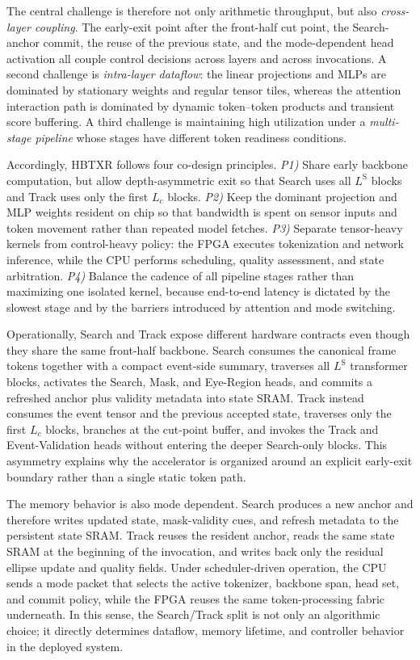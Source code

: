 \documentclass[journal]{IEEEtran}
\begin{document}
The central challenge is therefore not only arithmetic throughput, but also \emph{cross-layer coupling}. The early-exit point after the front-half cut point, the Search-anchor commit, the reuse of the previous state, and the mode-dependent head activation all couple control decisions across layers and across invocations. A second challenge is \emph{intra-layer dataflow}: the linear projections and MLPs are dominated by stationary weights and regular tensor tiles, whereas the attention interaction path is dominated by dynamic token--token products and transient score buffering. A third challenge is maintaining high utilization under a \emph{multi-stage pipeline} whose stages have different token readiness conditions.

Accordingly, HBTXR follows four co-design principles. \emph{P1)} Share early backbone computation, but allow depth-asymmetric exit so that Search uses all $L^{\mathrm S}$ blocks and Track uses only the first $L_c$ blocks. \emph{P2)} Keep the dominant projection and MLP weights resident on chip so that bandwidth is spent on sensor inputs and token movement rather than repeated model fetches. \emph{P3)} Separate tensor-heavy kernels from control-heavy policy: the FPGA executes tokenization and network inference, while the CPU performs scheduling, quality assessment, and state arbitration. \emph{P4)} Balance the cadence of all pipeline stages rather than maximizing one isolated kernel, because end-to-end latency is dictated by the slowest stage and by the barriers introduced by attention and mode switching.


Operationally, Search and Track expose different hardware contracts even though they share the same front-half backbone. Search consumes the canonical frame tokens together with a compact event-side summary, traverses all $L^{\mathrm S}$ transformer blocks, activates the Search, Mask, and Eye-Region heads, and commits a refreshed anchor plus validity metadata into state SRAM. Track instead consumes the event tensor and the previous accepted state, traverses only the first $L_c$ blocks, branches at the cut-point buffer, and invokes the Track and Event-Validation heads without entering the deeper Search-only blocks. This asymmetry explains why the accelerator is organized around an explicit early-exit boundary rather than a single static token path.

The memory behavior is also mode dependent. Search produces a new anchor and therefore writes updated state, mask-validity cues, and refresh metadata to the persistent state SRAM. Track reuses the resident anchor, reads the same state SRAM at the beginning of the invocation, and writes back only the residual ellipse update and quality fields. Under scheduler-driven operation, the CPU sends a mode packet that selects the active tokenizer, backbone span, head set, and commit policy, while the FPGA reuses the same token-processing fabric underneath. In this sense, the Search/Track split is not only an algorithmic choice; it directly determines dataflow, memory lifetime, and controller behavior in the deployed system.
\end{document}
